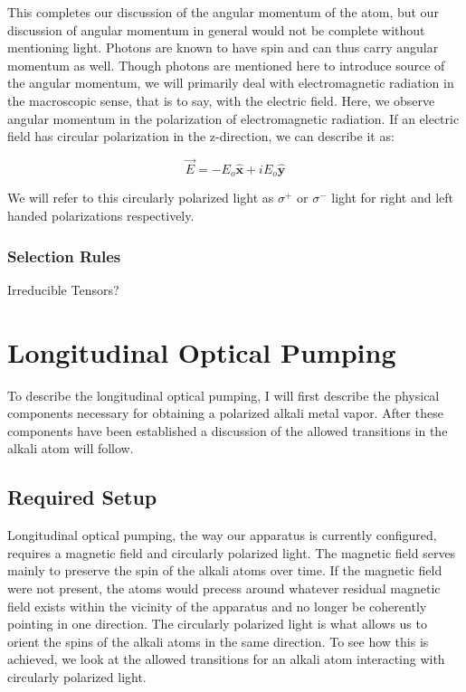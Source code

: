 \documentclass[letter,12pt]{article}
\newcommand{\xhat}{\hat{\textbf{x}}}
\newcommand{\yhat}{\hat{\textbf{y}}}
\begin{document}
		This completes our discussion of the angular momentum
		of the atom, but our discussion of angular momentum in 
		general would not be complete without mentioning light.
		Photons are known to have spin and can thus carry 
		angular momentum as well. Though photons are mentioned
		here to introduce source of the angular momentum,
		we will primarily deal with
		electromagnetic radiation in the macroscopic sense, 
		that is to say, with the electric field. Here, we 
		observe angular momentum in the polarization of 
		electromagnetic radiation. If an electric field has
		circular polarization in the z-direction, we can 
		describe it as:

		\begin{equation}
			\vec{E}=-E_o \xhat  +iE_o \yhat 
		\end{equation}

		We will refer to this circularly polarized light as 
		$\sigma^{+}$ or $\sigma^{-}$ light for right and 
		left handed polarizations respectively.
		\subsubsection{Selection Rules}\label{selectionRules}

        Irreducible Tensors?

\section{Longitudinal Optical Pumping}
To describe the longitudinal optical pumping, I will
first describe the physical components necessary for
obtaining a polarized alkali metal vapor. After these 
components have been established a discussion of the 
allowed transitions in the alkali atom will follow. 
	\subsection{Required Setup}
    Longitudinal optical pumping, the way our apparatus is 
    currently configured, requires a magnetic field and
    circularly polarized light. The magnetic field
	serves mainly to preserve the spin of the alkali
	atoms over time. If the magnetic field were not 
	present, the atoms would precess around whatever
	residual magnetic field exists within the vicinity
	of the apparatus and no longer be coherently pointing
	in one direction. The circularly polarized light
	is what allows us to orient the spins of the alkali
	atoms in the same direction. To see how this is
	achieved, we look at the allowed transitions for
	an alkali atom interacting with circularly polarized
	light. 
\end{document}

